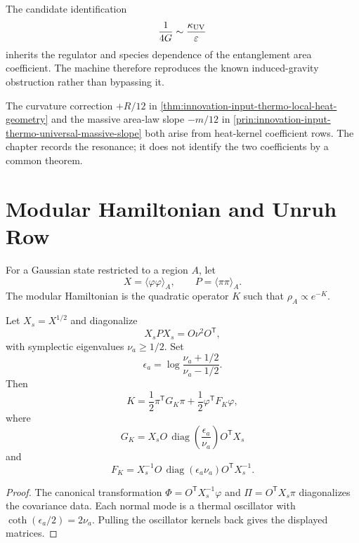 \begin{principle}
\label{prin:innovation-input-thermo-species-boundary}
The candidate identification
$$
\frac{1}{4G}\sim\frac{\kappa_{\rm UV}}{\varepsilon}
$$
inherits the regulator and species dependence of the entanglement area
coefficient. The machine therefore reproduces the known induced-gravity
obstruction rather than bypassing it.
\end{principle}

\begin{remark}
\label{rem:innovation-input-thermo-two-twelfths}
The curvature correction $+R/12$ in
\autoref{thm:innovation-input-thermo-local-heat-geometry} and the massive
area-law slope $-m/12$ in
\autoref{prin:innovation-input-thermo-universal-massive-slope} both arise
from heat-kernel coefficient rows. The chapter records the resonance; it
does not identify the two coefficients by a common theorem.
\end{remark}

\section{Modular Hamiltonian and Unruh Row}
\label{sec:innovation-input-thermo-modular-unruh}

\begin{definition}
\label{def:innovation-input-thermo-gaussian-modular-hamiltonian-row}
For a Gaussian state restricted to a region $A$, let
$$
X=\langle\varphi\varphi\rangle_A,
\qquad
P=\langle\pi\pi\rangle_A.
$$
The modular Hamiltonian is the quadratic operator $K$ such that
$\rho_A\propto e^{-K}$.
\end{definition}

\begin{theorem}
\label{thm:innovation-input-thermo-gaussian-modular-normal-form}
Let $X_s=X^{1/2}$ and diagonalize
$$
X_sPX_s=O\nu^2O^{\mathsf T},
$$
with symplectic eigenvalues $\nu_a\ge1/2$. Set
$$
\epsilon_a=\log\frac{\nu_a+1/2}{\nu_a-1/2}.
$$
Then
$$
K=\frac12\pi^{\mathsf T}G_K\pi+\frac12\varphi^{\mathsf T}F_K\varphi,
$$
where
$$
G_K=X_sO\,\operatorname{diag}\left(\frac{\epsilon_a}{\nu_a}\right)
O^{\mathsf T}X_s
$$
and
$$
F_K=X_s^{-1}O\,\operatorname{diag}(\epsilon_a\nu_a)
O^{\mathsf T}X_s^{-1}.
$$
\end{theorem}

\begin{proof}
The canonical transformation
$\Phi=O^{\mathsf T}X_s^{-1}\varphi$ and
$\Pi=O^{\mathsf T}X_s\pi$ diagonalizes the covariance data. Each normal
mode is a thermal oscillator with
$\coth(\epsilon_a/2)=2\nu_a$. Pulling the oscillator kernels back gives
the displayed matrices.
\end{proof}

